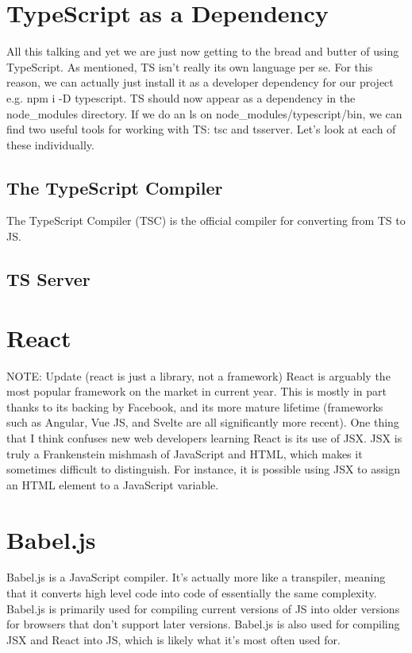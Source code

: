 \documentclass{article}
\begin{document}
\section{TypeScript as a Dependency}

All this talking and yet we are just now getting to the bread and butter of using TypeScript. As mentioned, TS
isn't really its own language per se. For this reason, we can actually just install it as a developer
dependency for our project e.g. npm i -D typescript. TS should now appear as a dependency in the node\_modules
directory. If we do an ls on node\_modules/typescript/bin, we can find two useful tools for working with TS:
tsc and tsserver. Let's look at each of these individually.

\subsection{The TypeScript Compiler}

The TypeScript Compiler (TSC) is the official compiler for converting from TS to JS.

\subsection{TS Server}

\section{React}

NOTE: Update (react is just a library, not a framework)
React is arguably the most popular framework on the market in current year. This is mostly in part thanks to
its backing by Facebook, and its more mature lifetime (frameworks such as Angular, Vue JS, and Svelte are all
significantly more recent). One thing that I think confuses new web developers learning React is its use of
JSX. JSX is truly a Frankenstein mishmash of JavaScript and HTML, which makes it sometimes difficult to
distinguish. For instance, it is possible using JSX to assign an HTML element to a JavaScript variable.

\section{Babel.js}

Babel.js is a JavaScript compiler. It's actually more like a transpiler, meaning that it converts high level
code into code of essentially the same complexity. Babel.js is primarily used for compiling current versions
of JS into older versions for browsers that don't support later versions. Babel.js is also used for compiling
JSX and React into JS, which is likely what it's most often used for.
\end{document}

